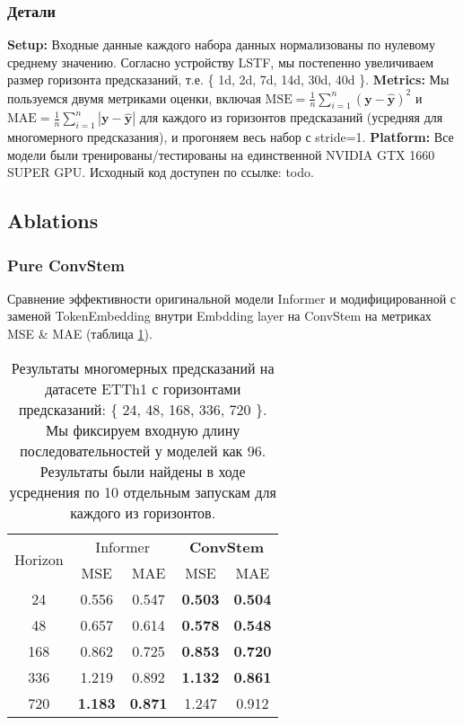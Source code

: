 
\subsubsection{Детали}

\textbf{Setup:} Входные данные каждого набора данных нормализованы по нулевому среднему значению. 
Согласно устройству LSTF, мы постепенно увеличиваем размер горизонта предсказаний, 
т.е. \{ 1d, 2d, 7d, 14d, 30d, 40d \}.
\textbf{Metrics:} Мы пользуемся двумя метриками оценки, включая 
$\text{MSE}=\frac{1}{n} \sum_{i=1}^n (\bm{y} - \hat{\bm{y}})^2$ 
и $\text{MAE}=\frac{1}{n} \sum_{i=1}^n |\bm{y} - \hat{\bm{y}}|$ 
для каждого из горизонтов предсказаний (усредняя для многомерного 
предсказания), и прогоняем весь набор с stride=1.
\textbf{Platform:}
Все модели были тренированы/тестированы на единственной 
NVIDIA GTX 1660 SUPER GPU. Исходный код доступен 
по ссылке: {\color{red} todo}.

\subsection{Ablations}

\subsubsection{Pure ConvStem}

Сравнение эффективности оригинальной модели Informer и модифицированной
с заменой TokenEmbedding внутри Embdding layer на ConvStem 
на метриках MSE \& MAE (таблица \ref{tab:etth1-convstem}).

\begin{table}[!ht]
    \centering
    \begin{tabular}{c  cc  cc}
    \toprule
    \multirow{2}{*}{{Horizon}} 
      & \multicolumn{2}{c}{{Informer}} 
      & \multicolumn{2}{c}{\textbf{ConvStem}} \\
    \cmidrule(lr){2-3} \cmidrule(lr){4-5}
      & {MSE} & {MAE} 
      & {MSE} & {MAE} \\
    \midrule
    24   & 0.556 & 0.547 & \textbf{0.503} & \textbf{0.504} \\
    48   & 0.657 & 0.614 & \textbf{0.578} & \textbf{0.548} \\
    168  & 0.862 & 0.725 & \textbf{0.853} & \textbf{0.720} \\
    336  & 1.219 & 0.892 & \textbf{1.132} & \textbf{0.861} \\
    720  & \textbf{1.183} & \textbf{0.871} & 1.247 & 0.912 \\
    \bottomrule
    \end{tabular}
    \caption{Результаты многомерных предсказаний на датасете ETTh1 с 
    горизонтами предсказаний: \{ 24, 48, 168, 336, 720 \}. 
    Мы фиксируем входную длину последовательностей у моделей как 96.
    Результаты были найдены в ходе усреднения по 10 отдельным запускам 
    для каждого из горизонтов.}
    \label{tab:etth1-convstem}
\end{table}

